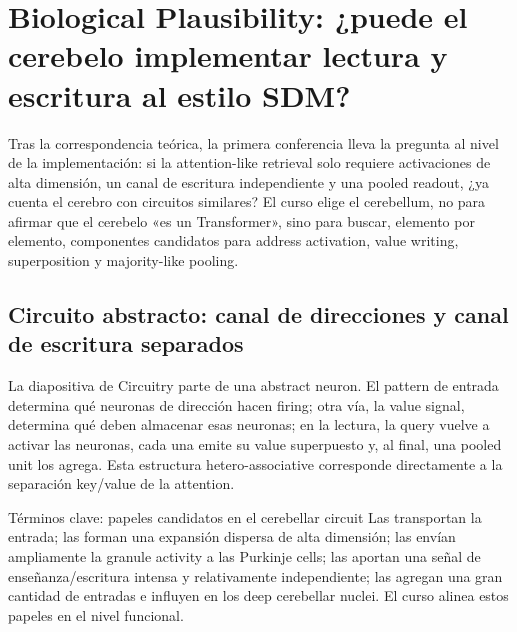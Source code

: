 \section{Biological Plausibility: ¿puede el cerebelo implementar lectura y escritura al estilo SDM?}

Tras la correspondencia teórica, la primera conferencia lleva la pregunta al nivel de la implementación: si la attention-like retrieval solo requiere activaciones de alta dimensión, un canal de escritura independiente y una pooled readout, ¿ya cuenta el cerebro con circuitos similares? El curso elige el cerebellum, no para afirmar que el cerebelo «es un Transformer», sino para buscar, elemento por elemento, componentes candidatos para address activation, value writing, superposition y majority-like pooling.

\subsection{Circuito abstracto: canal de direcciones y canal de escritura separados}

La diapositiva de Circuitry parte de una abstract neuron. El pattern de entrada determina qué neuronas de dirección hacen firing; otra vía, la value signal, determina qué deben almacenar esas neuronas; en la lectura, la query vuelve a activar las neuronas, cada una emite su value superpuesto y, al final, una pooled unit los agrega. Esta estructura hetero-associative corresponde directamente a la separación key/value de la attention.



\begin{knowledgebox}{Términos clave: papeles candidatos en el cerebellar circuit}
Las  transportan la entrada; las  forman una expansión dispersa de alta dimensión; las  envían ampliamente la granule activity a las Purkinje cells; las  aportan una señal de enseñanza/escritura intensa y relativamente independiente; las  agregan una gran cantidad de entradas e influyen en los deep cerebellar nuclei. El curso alinea estos papeles en el nivel funcional.
\end{knowledgebox}

